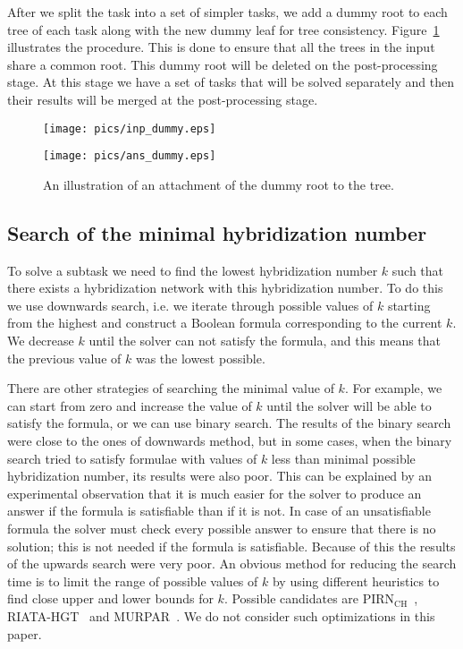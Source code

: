 \documentclass[runningheads, envcountsame, a4paper]{llncs}
\begin{document}
After we split the task into a set of simpler tasks, we add a dummy root to each tree of each task along with 
the new dummy leaf for tree consistency. Figure~\ref{dummy-example} illustrates the procedure. 
This is done to ensure that all the trees in the input share a common root. 
This dummy root will be deleted on the post-processing stage. At this stage we have a set of tasks that will be solved 
separately and then their results will be merged at the post-processing stage.

\begin{figure}[t]
  \centering
  \begin{minipage}[b]{0.39\linewidth}
    \texttt{[image: pics/inp\_dummy.eps]}
  \end{minipage}
  \hfill
  \begin{minipage}[b]{0.59\linewidth}
    \texttt{[image: pics/ans\_dummy.eps]}
  \end{minipage}
  \caption{An illustration of an attachment of the dummy root to the tree.}
  \label{dummy-example}
\end{figure}

\subsection{Search of the minimal hybridization number}

To solve a subtask we need to find the lowest hybridization number $k$ such that there exists a hybridization 
network with this hybridization number. To do this we use downwards search, i.e. we iterate through possible values of $k$ starting from the highest 
and construct a Boolean formula corresponding to the current $k$. 
We decrease $k$ until the solver can not satisfy the formula, and this means that the previous value of $k$ was the 
lowest possible.

There are other strategies of searching the minimal value of $k$. For example, we can start from 
zero and increase the value of $k$ until the solver will be able to satisfy the formula, or we can use binary search. 
The results of the binary search were close to the ones of downwards method, 
but in some cases, when the binary search tried to satisfy formulae with values of $k$ less than minimal possible hybridization number, 
its results were also poor. 
This can be explained by an experimental observation that it is much easier for the solver to produce an answer if the formula is satisfiable than if it is not. 
In case of an unsatisfiable formula the solver must check every possible answer to ensure that there is no solution; this is not needed if the 
formula is satisfiable. Because of this the results of the upwards search were very poor. An obvious method 
for reducing the search time is to limit the range of possible values of $k$ by using different heuristics to find close upper and lower bounds for $k$. 
Possible candidates are PIRN$\mathrm{_{CH}}$~\cite{wu2013algorithm}, RIATA-HGT~\cite{nakhleh2005riata} and MURPAR~\cite{park2012murpar}. We do not consider such optimizations in this paper.
\end{document}
